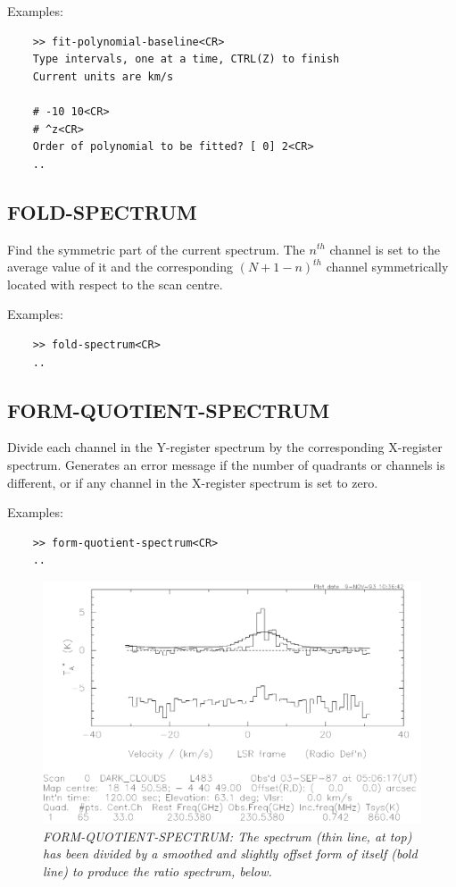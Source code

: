 \documentclass[11pt,twoside]{report}
\begin{document}
Examples:
\begin{verbatim}
    >> fit-polynomial-baseline<CR>
    Type intervals, one at a time, CTRL(Z) to finish
    Current units are km/s

    # -10 10<CR>
    # ^z<CR>
    Order of polynomial to be fitted? [ 0] 2<CR>
    ..
\end{verbatim}

\subsection{FOLD-SPECTRUM} 

Find the symmetric part of the current spectrum. The $n^{th}$ channel is set to
the average value of it and the corresponding $(N+1-n)^{th}$ channel
symmetrically located with respect to the scan centre.

Examples:
\begin{verbatim}
    >> fold-spectrum<CR>
    ..
\end{verbatim}

\subsection{FORM-QUOTIENT-SPECTRUM} 

Divide each channel in the Y-register spectrum by the corresponding X-register
spectrum. Generates an error message if the number of quadrants or channels
is different, or if any channel in the X-register spectrum is set to zero.

Examples:
\begin{verbatim}
    >> form-quotient-spectrum<CR>
    ..
\end{verbatim}

\begin{figure}[htbp]
\begin{center}
\includegraphics[scale=0.65]{quotient}
\protect\parbox{5.5in}
{\caption[QUOTIENT]
{\sl
FORM-QUOTIENT-SPECTRUM: The spectrum (thin line, at top) has been divided by
a smoothed and slightly offset form of itself (bold line) to produce the
ratio spectrum, below.
\label{QUOTIENT}
}
}
\end{center}
\end{figure}
\end{document}
